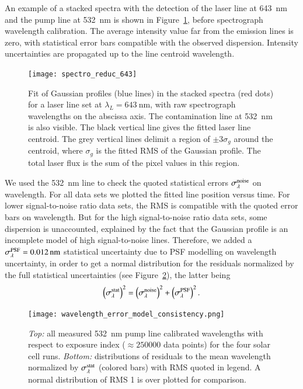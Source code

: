 An example of a stacked spectra with the detection of the laser line at \SI{643}{\nm} and the pump line at \SI{532}{\nm} is shown in Figure~\ref{fig:spectro_reduc_643}, before spectrograph wavelength calibration. The average intensity value far from the emission lines is zero, with statistical error bars compatible with the observed dispersion. Intensity uncertainties are propagated up to the line centroid wavelength. 

\begin{figure}[!h]
\centering
\texttt{[image: spectro\_reduc\_643]}
\caption{Fit of Gaussian profiles (blue lines) in the stacked spectra (red dots) for a laser line set at $\lambda_L=\SI{643}{\nm}$, with raw spectrograph wavelengths on the abscissa axis. The contamination line at \SI{532}{nm} is also visible. The black vertical line gives the fitted laser line centroid. The grey vertical lines delimit a region of $\pm 3\sigma_g$ around the centroid, where $\sigma_g$ is the fitted RMS of the Gaussian profile. The total laser flux is the sum of the pixel values in this region.}\label{fig:spectro_reduc_643}
\end{figure}

We used the \SI{532}{\nm} line to check the quoted statistical errors $\sigma_\lambda^{\rm noise}$ on wavelength. For all data sets we plotted the fitted line position versus time. For lower signal-to-noise ratio data sets, the RMS is compatible with the quoted error bars on wavelength. But for the high signal-to-noise ratio data sets, some dispersion is unaccounted, explained by the fact that the Gaussian profile is an incomplete model of high signal-to-noise lines. Therefore, we added a $\sigma_\lambda^{\rm PSF}=\SI{0.012}{\nm}$ statistical uncertainty due to PSF modelling on wavelength uncertainty, in order to get a normal distribution for the residuals normalized by the full statistical uncertainties (see Figure~\ref{fig:wavelength_error_model_consistency}), the latter being
\begin{equation}
    \left(\sigma_{\lambda}^{\rm stat}\right)^2 =  \left(\sigma_{\lambda}^{\rm noise}\right)^2 +  \left(\sigma_{\lambda}^{\rm PSF}\right)^2.
\end{equation}

\begin{figure}[!h]
\centering
\texttt{[image: wavelength\_error\_model\_consistency.png]}
\caption{\textit{Top:} all measured \SI{532}{\nm} pump line calibrated wavelengths with respect to exposure index ($\approx\num{250000}$ data points) for the four solar cell runs. \textit{Bottom:} distributions of residuals to the mean wavelength normalized by $\sigma_{\lambda}^{\rm stat}$ (colored bars) with RMS quoted in legend. A normal distribution of RMS 1 is over plotted for comparison.}\label{fig:wavelength_error_model_consistency}
\end{figure}

